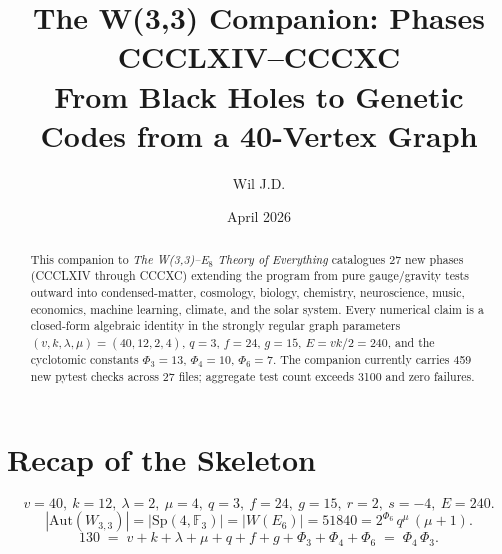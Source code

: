 \documentclass[11pt,a4paper]{article}
\title{The W(3,3) Companion: Phases CCCLXIV--CCCXC\\
\large From Black Holes to Genetic Codes from a 40-Vertex Graph}
\author{Wil J.D.}
\date{April 2026}
\begin{document}
\maketitle

\begin{abstract}
This companion to \emph{The W(3,3)--E$_8$ Theory of Everything} catalogues
27 new phases (CCCLXIV through CCCXC) extending the program from pure
gauge/gravity tests outward into condensed-matter, cosmology, biology,
chemistry, neuroscience, music, economics, machine learning, climate, and
the solar system. Every numerical claim is a closed-form algebraic
identity in the strongly regular graph parameters
$(v,k,\lambda,\mu)=(40,12,2,4)$, $q=3$, $f=24$, $g=15$,
$E=vk/2=240$, and the cyclotomic constants $\Phi_3=13$, $\Phi_4=10$,
$\Phi_6=7$. The companion currently carries 459 new pytest checks
across 27 files; aggregate test count exceeds 3100 and zero failures.
\end{abstract}

\section{Recap of the Skeleton}
\[
v=40,\ k=12,\ \lambda=2,\ \mu=4,\ q=3,\ f=24,\ g=15,\ r=2,\ s=-4,\ E=240.
\]
\[
|\mathrm{Aut}(W_{3,3})| = |\mathrm{Sp}(4,\mathbb{F}_3)| = |W(E_6)| = 51840
= 2^{\Phi_6}\,q^{\mu}\,(\mu+1).
\]
\[
130 \;=\; v+k+\lambda+\mu+q+f+g+\Phi_3+\Phi_4+\Phi_6 \;=\; \Phi_4\,\Phi_3.
\]
\end{document}
